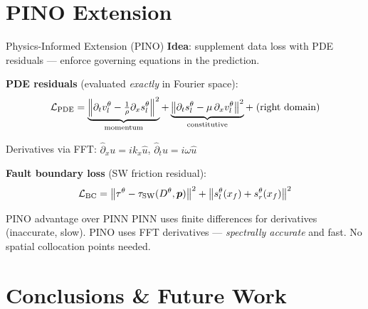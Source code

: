 \documentclass[aspectratio=169,12pt]{beamer}
\newcommand{\loss}{\mathcal{L}}
\newcommand{\vl}{v_l}
\newcommand{\ssl}{s_l}
\begin{document}
\section{PINO Extension}

\begin{frame}{Physics-Informed Extension (PINO)}
  \textbf{Idea}: supplement data loss with PDE residuals — enforce governing equations in the prediction.

  \vspace{6pt}
  \textbf{PDE residuals} (evaluated \textit{exactly} in Fourier space):
  \[
    \loss_{\rm PDE} = \underbrace{\left\|\partial_t \vl^\theta
                      - \tfrac{1}{\rho}\partial_x \ssl^\theta\right\|^2}_{\text{momentum}}
                    + \underbrace{\left\|\partial_t \ssl^\theta
                      - \mu\,\partial_x \vl^\theta\right\|^2}_{\text{constitutive}}
                    + \; \text{(right domain)}
  \]

  Derivatives via FFT: $\hat{\partial}_x u = ik_x\hat{u}$, \quad $\hat{\partial}_t u = i\omega\hat{u}$

  \vspace{6pt}
  \textbf{Fault boundary loss} (SW friction residual):
  \[
    \loss_{\rm BC} = \bigl\|\tau^\theta - \tau_{\rm SW}(D^\theta, \bm{p})\bigr\|^2
                   + \bigl\|s_l^\theta(x_f) + s_r^\theta(x_f)\bigr\|^2
  \]

  \vspace{4pt}
  \begin{alertblock}{PINO advantage over PINN}
    \small
    PINN uses finite differences for derivatives (inaccurate, slow).
    PINO uses FFT derivatives — \textit{spectrally accurate} and fast.
    No spatial collocation points needed.
  \end{alertblock}
\end{frame}

\section{Conclusions \& Future Work}
\end{document}
